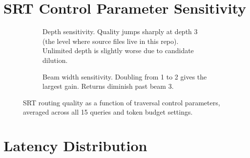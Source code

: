 \documentclass[11pt,a4paper]{article}
\begin{document}
\section{SRT Control Parameter Sensitivity}

\begin{figure}[h]
\centering
\begin{subfigure}[t]{0.48\textwidth}
\caption{Depth sensitivity. Quality jumps sharply at depth 3 (the level where source files live in this repo). Unlimited depth is slightly worse due to candidate dilution.}
\end{subfigure}
\hfill
\begin{subfigure}[t]{0.48\textwidth}
\caption{Beam width sensitivity. Doubling from 1 to 2 gives the largest gain. Returns diminish past beam 3.}
\end{subfigure}
\caption{SRT routing quality as a function of traversal control parameters, averaged across all 15 queries and token budget settings.}
\end{figure}

\section{Latency Distribution}
\end{document}
